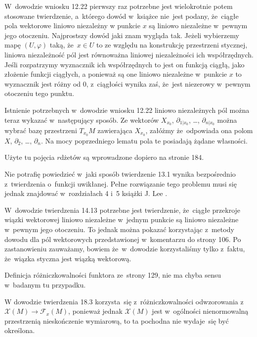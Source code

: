 \documentclass[a4paper,11pt]{article}
\begin{document}
\start {} W~dowodzie wniosku 12.22 pierwszy raz potrzebne jest
wielokrotnie potem stosowane twierdzenie, a~którego dowód w~książce
nie~jest podany, że~ciągłe pola wektorowe liniowo niezależny w punkcie
$x$ są liniowo niezależne w~pewnym jego otoczeniu. Najprostszy dowód
jaki znam wygląda tak. Jeżeli wybierzemy mapę $( U, \varphi )$ taką,
że~$x \in U$ to ze względu na konstrukcję przestrzeni stycznej,
liniowa niezależność pól jest równoważna liniowej niezależności ich
współrzędnych. Jeśli rozpatrzymy wyznacznik ich współrzędnych to jest
on funkcją ciągłą, jako złożenie funkcji ciągłych, a ponieważ są one
liniowo niezależne w~punkcie $x$ to wyznacznik jest różny od 0,
z~ciągłości wynika zaś, że~jest niezerowy w~pewnym otoczeniu tego
punktu.

\start {} Istnienie potrzebnych w~dowodzie wniosku 12.22
liniowo niezależnych pól można teraz wykazać w~następujący sposób. Ze
wektorów $X_{ x_{ 0 } }$, $\partial_{ 1 | { x_{ 0 } } }$, \ldots,
$\partial_{ n | { x_{ 0 } } }$ można wybrać bazę przestrzeni
$T_{ { x_{ 0 } } }M$ zawierająca $X_{ { x_{ 0 } } }$, załóżmy
że~odpowiada ona polom $X$, $\partial_{ 2 }$, \ldots,
$\partial_{ n }$. Na mocy poprzedniego lematu pola te posiadają żądane
własności.

\start {} Użyte tu pojęcia $r$\dywiz dżetów są wprowadzone
dopiero na stronie 184.

\start {} Nie potrafię powiedzieć w~jaki sposób twierdzenie
13.1 wynika bezpośrednio z~twierdzenia o~funkcji uwikłanej. Pełne
rozwiązanie tego problemu musi się jednak znajdować w~rozdziałach 4
i~5 książki J. Lee \cite{Lee13}.

\start {} W~dowodzie twierdzenia 14.13 potrzebne jest
twierdzenie, że~ciągłe przekroje wiązki wektorowej liniowo niezależne
w~jednym punkcie są liniowo niezależne w~pewnym jego otoczeniu. To
jednak można pokazać korzystając z~metody dowodu dla pól wektorowych
przedstawionej w~komentarzu do strony 106. Po zastanowieniu zauważamy,
bowiem że~w~dowodzie korzystaliśmy tylko z~faktu, że~wiązka styczna
jest wiązką wektorową.

\start {} Definicja różniczkowalności funktora ze~strony 129,
nie ma chyba sensu w~badanym tu przypadku.

\start {} W dowodzie twierdzenia 18.3 korzysta~się
z~różniczkowalności odwzorowania
z~$\mathcal{X}( M ) \rightarrow \mathcal{F}_{ x }( M )$, ponieważ
jednak $\mathcal{X}( M )$ jest w~ogólności nienormowalną przestrzenią
nieskończenie wymiarową, to ta pochodna nie wydaje~się być określona.
\end{document}

